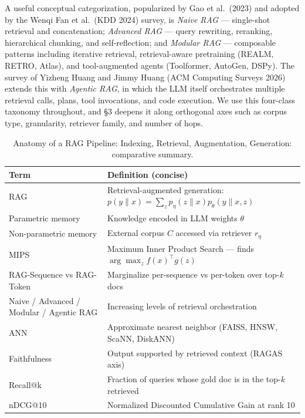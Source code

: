 \documentclass{article}
\begin{document}
A useful conceptual categorization, popularized by Gao et al.~(2023) and adopted by the Wenqi Fan et al.~(KDD 2024) survey, is \emph{Naive RAG} --- single-shot retrieval and concatenation; \emph{Advanced RAG} --- query rewriting, reranking, hierarchical chunking, and self-reflection; and \emph{Modular RAG} --- composable patterns including iterative retrieval, retrieval-aware pretraining (REALM, RETRO, Atlas), and tool-augmented agents (Toolformer, AutoGen, DSPy). The survey of Yizheng Huang and Jimmy Huang (ACM Computing Surveys 2026) extends this with \emph{Agentic RAG}, in which the LLM itself orchestrates multiple retrieval calls, plans, tool invocations, and code execution. We use this four-class taxonomy throughout, and §3 deepens it along orthogonal axes such as corpus type, granularity, retriever family, and number of hops.

\begin{table}[t]
\centering
\caption{Anatomy of a RAG Pipeline: Indexing, Retrieval, Augmentation, Generation: comparative summary.}
\label{tab:anatomy-of-a-rag-pipeline-indexing-retrieval-augmentation-ge}
\begin{tabular}{>{\raggedright\arraybackslash}p{0.3306\linewidth}
  >{\raggedright\arraybackslash}p{0.6694\linewidth}}
\toprule
Term & Definition (concise) \\
\midrule
RAG & Retrieval-augmented generation: \(p(y\|x) = \sum_z p_\eta(z\|x) p_\theta(y\|x, z)\) \\
Parametric memory & Knowledge encoded in LLM weights \(\theta\) \\
Non-parametric memory & External corpus \(C\) accessed via retriever \(r_\eta\) \\
MIPS & Maximum Inner Product Search --- finds \(\arg\max_z f(x)^\top g(z)\) \\
RAG-Sequence vs RAG-Token & Marginalize per-sequence vs per-token over top-\(k\) docs \\
Naive / Advanced / Modular / Agentic RAG & Increasing levels of retrieval orchestration \\
ANN & Approximate nearest neighbor (FAISS, HNSW, ScaNN, DiskANN) \\
Faithfulness & Output supported by retrieved context (RAGAS axis) \\
Recall@k & Fraction of queries whose gold doc is in the top-\(k\) retrieved \\
nDCG@10 & Normalized Discounted Cumulative Gain at rank 10 \\
\end{tabular}
\end{table}
\end{document}
